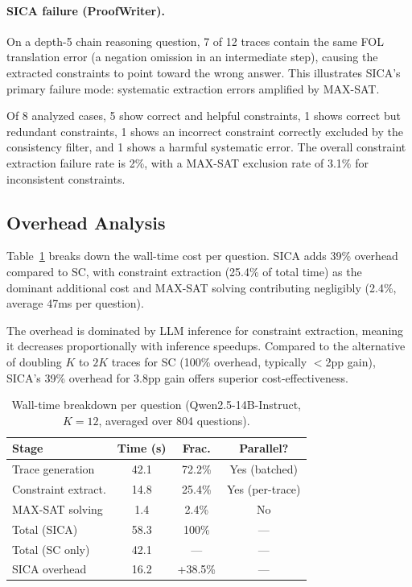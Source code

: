 \documentclass[11pt,a4paper]{article}
\begin{document}
\paragraph{SICA failure (ProofWriter).}
On a depth-5 chain reasoning question, 7 of 12 traces contain the same FOL translation error (a negation omission in an intermediate step), causing the extracted constraints to point toward the wrong answer.
This illustrates SICA's primary failure mode: systematic extraction errors amplified by MAX-SAT.

Of 8 analyzed cases, 5 show correct and helpful constraints, 1 shows correct but redundant constraints, 1 shows an incorrect constraint correctly excluded by the consistency filter, and 1 shows a harmful systematic error.
The overall constraint extraction failure rate is 2\%, with a MAX-SAT exclusion rate of 3.1\% for inconsistent constraints.


\subsection{Overhead Analysis}
\label{sec:overhead}

Table~\ref{tab:overhead} breaks down the wall-time cost per question.
SICA adds 39\% overhead compared to SC, with constraint extraction (25.4\% of total time) as the dominant additional cost and MAX-SAT solving contributing negligibly (2.4\%, average 47ms per question).

The overhead is dominated by LLM inference for constraint extraction, meaning it decreases proportionally with inference speedups.
Compared to the alternative of doubling $K$ to $2K$ traces for SC (100\% overhead, typically $<$2pp gain), SICA's 39\% overhead for 3.8pp gain offers superior cost-effectiveness.

\begin{table}[t]
\centering
\small
\begin{tabular}{lccc}
\toprule
\textbf{Stage} & \textbf{Time (s)} & \textbf{Frac.} & \textbf{Parallel?} \\
\midrule
Trace generation     & 42.1 & 72.2\% & Yes (batched) \\
Constraint extract.  & 14.8 & 25.4\% & Yes (per-trace) \\
MAX-SAT solving      & 1.4  & 2.4\%  & No \\
\midrule
Total (SICA)         & 58.3 & 100\%  & --- \\
Total (SC only)      & 42.1 & ---    & --- \\
SICA overhead        & 16.2 & +38.5\% & --- \\
\bottomrule
\end{tabular}
\caption{Wall-time breakdown per question (Qwen2.5-14B-Instruct, $K\!=\!12$, averaged over 804 questions).}
\label{tab:overhead}
\end{table}
\end{document}
